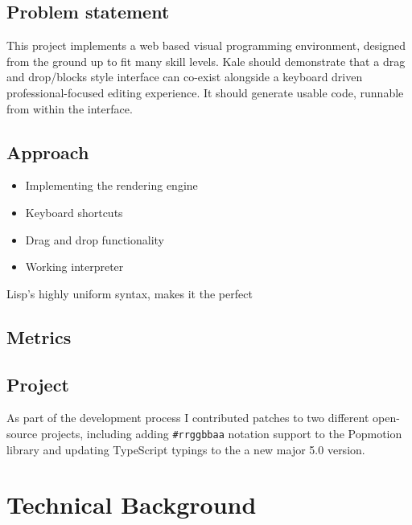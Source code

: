 \documentclass[11pt]{report}
\begin{document}
\section{Problem statement}
This project implements a web based visual programming environment, designed
from the ground up to fit many skill levels. Kale should demonstrate that a
drag and drop/blocks style interface can co-exist alongside a keyboard driven
professional-focused editing experience. It should generate usable code,
runnable from within the interface.

\section{Approach}

\begin{itemize}
	\item Implementing the rendering engine
	\item Keyboard shortcuts
	\item Drag and drop functionality
	\item Working interpreter
\end{itemize}
Lisp's highly uniform syntax, makes it the perfect 

\section{Metrics}
\section{Project}

As part of the development process I contributed patches to two different
open-source projects, including adding \texttt{\#rrggbbaa} notation support
to the Popmotion library \cite{github-pr-popmotion} and updating
 TypeScript typings to the a new major 5.0
version\cite{github-pr-styled-components}.

\chapter{Technical Background}
\end{document}
